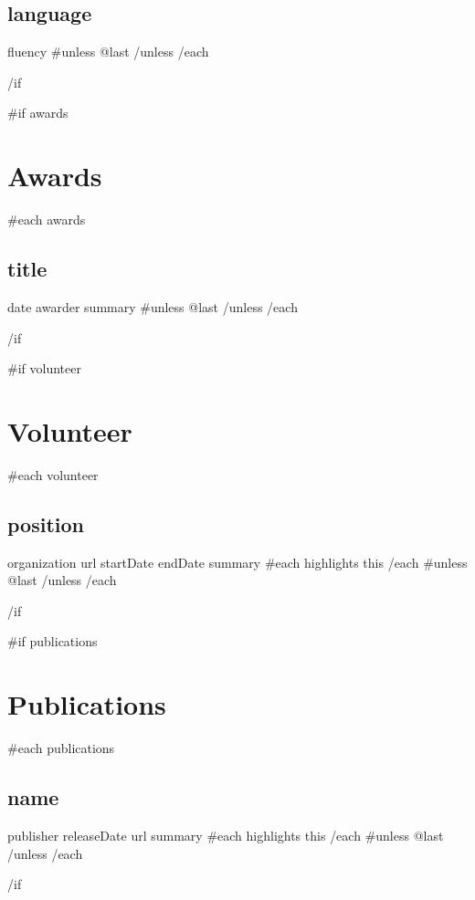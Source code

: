 \documentclass[letterpaper]{article}
\newcommand{\sectionsep}[0]{}
\newcommand{\subsectionsep}[0]{}
\begin{document}
\begin{minipage}[t][5cm][t]{0.25\textwidth}
\begin{small}
{    \subsection*{ {{ language }} } {
      {{ fluency }}\newline
    }
    {{#unless @last}} \subsectionsep {{/unless}}
    {{/each}}
  }
  \sectionsep
  {{/if}}

  {{#if awards}}
  \section*{Awards} {
    {{#each awards}}
    \subsection*{ {{ title }} } {
      {{ date }}\newline
      {{ awarder }}\newline
      {{ summary }}\newline
    }
    {{#unless @last}} \subsectionsep {{/unless}}
    {{/each}}
  }
  \sectionsep
  {{/if}}

  {{#if volunteer}}
  \section*{Volunteer} {
    {{#each volunteer}}
    \subsection*{ {{ position }} } {
      {{ organization }}\newline
      {{ url }}\newline
      {{ startDate }}\newline
      {{ endDate }}\newline
      {{ summary }}\newline
    }
    {{#each highlights}}
      {{ this }} 
    {{/each}}\newline
    {{#unless @last}} \subsectionsep {{/unless}}
    {{/each}}
  }
  \sectionsep
  {{/if}}

  {{#if publications}}
  \section*{Publications} {
    {{#each publications}}
    \subsection*{ {{ name }} } {
      {{ publisher }}\newline
      {{ releaseDate }}\newline
      {{ url }}\newline
      {{ summary }}\newline
    }
    {{#each highlights}}
      {{ this }} 
    {{/each}}\newline
    {{#unless @last}} \subsectionsep {{/unless}}
    {{/each}}
  }
  \sectionsep
  {{/if}}

\end{small}
\end{minipage}
\end{document}
